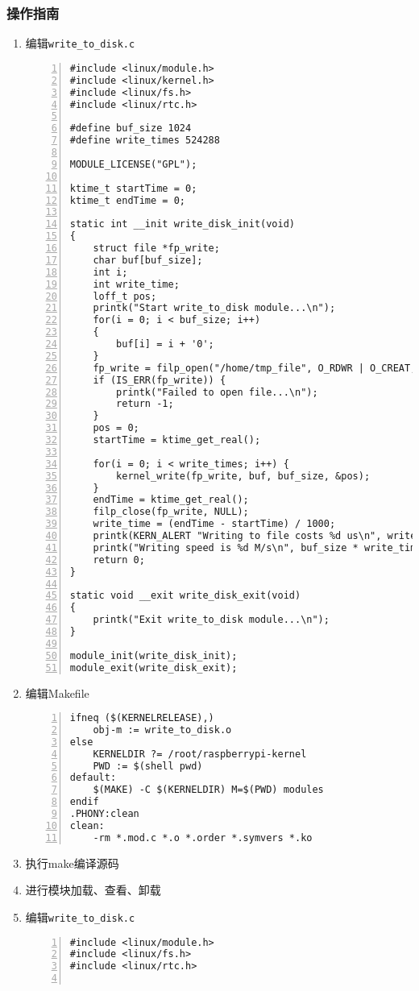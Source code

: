 \documentclass{article}
\begin{document}
\subsubsection{操作指南}
\begin{enumerate}
    \item 编辑\verb|write_to_disk.c|
\begin{lstlisting}[numbers=left]
#include <linux/module.h>
#include <linux/kernel.h> 
#include <linux/fs.h>
#include <linux/rtc.h>

#define buf_size 1024
#define write_times 524288

MODULE_LICENSE("GPL");

ktime_t startTime = 0;
ktime_t endTime = 0;

static int __init write_disk_init(void)
{
	struct file *fp_write;
	char buf[buf_size];
	int i;
	int write_time;
	loff_t pos;
	printk("Start write_to_disk module...\n");
	for(i = 0; i < buf_size; i++)
	{
		buf[i] = i + '0';
	}
	fp_write = filp_open("/home/tmp_file", O_RDWR | O_CREAT,0644);
	if (IS_ERR(fp_write)) {
		printk("Failed to open file...\n");
		return -1;
	}
	pos = 0;
    startTime = ktime_get_real();

	for(i = 0; i < write_times; i++) {
		kernel_write(fp_write, buf, buf_size, &pos);
	}
	endTime = ktime_get_real();
	filp_close(fp_write, NULL);
	write_time = (endTime - startTime) / 1000;
	printk(KERN_ALERT "Writing to file costs %d us\n", write_time);	
	printk("Writing speed is %d M/s\n", buf_size * write_times / write_time);
	return 0;
}

static void __exit write_disk_exit(void)
{
	printk("Exit write_to_disk module...\n");
}

module_init(write_disk_init);
module_exit(write_disk_exit);

\end{lstlisting}
    \item 编辑Makefile
\begin{lstlisting}[numbers=left]
ifneq ($(KERNELRELEASE),)
	obj-m := write_to_disk.o
else
	KERNELDIR ?= /root/raspberrypi-kernel
	PWD := $(shell pwd)
default:
	$(MAKE) -C $(KERNELDIR) M=$(PWD) modules
endif
.PHONY:clean
clean:
	-rm *.mod.c *.o *.order *.symvers *.ko

\end{lstlisting}
    \item 执行make编译源码
    \item 进行模块加载、查看、卸载
      \item 编辑\verb|write_to_disk.c|
\begin{lstlisting}[numbers=left]
#include <linux/module.h>
#include <linux/fs.h>
#include <linux/rtc.h>


\end{lstlisting}
\end{enumerate}
\end{document}
